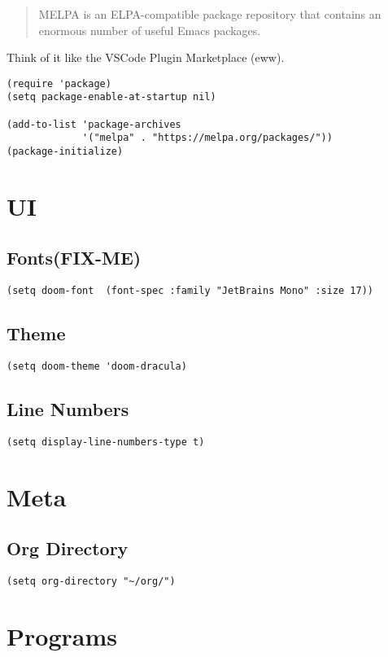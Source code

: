 \documentclass[11pt]{article}
\begin{document}
\begin{verse}
MELPA is an ELPA-compatible package repository that contains an enormous number of useful Emacs packages.\\[0pt]
\end{verse}

Think of it like the VSCode Plugin Marketplace (eww).

\begin{verbatim}
(require 'package)
(setq package-enable-at-startup nil)

(add-to-list 'package-archives
             '("melpa" . "https://melpa.org/packages/"))
(package-initialize)
\end{verbatim}
\section{UI}
\label{sec:org11ddd4b}
\subsection{Fonts(FIX-ME)}
\label{sec:orgdf2a86c}
\begin{verbatim}
(setq doom-font  (font-spec :family "JetBrains Mono" :size 17))
\end{verbatim}
\subsection{Theme}
\label{sec:orgbbcf125}
\begin{verbatim}
(setq doom-theme 'doom-dracula)
\end{verbatim}
\subsection{Line Numbers}
\label{sec:orgb2ac990}
\begin{verbatim}
(setq display-line-numbers-type t)
\end{verbatim}
\section{Meta}
\label{sec:orgb1db833}
\subsection{Org Directory}
\label{sec:org6b93add}
\begin{verbatim}
(setq org-directory "~/org/")
\end{verbatim}
\section{Programs}
\label{sec:org4198aee}
\end{document}
